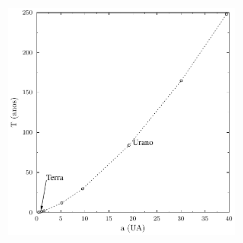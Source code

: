 \documentclass[a4paper]{article}
\begin{document}
\begin{respostas}
\begin{exercicio}
  
  \begin{compactenum}[(a)]
  \item {}\hfill
    \begin{center}
    \includegraphics[width=0.45\textwidth]{Txa_planetas_Sistema_Solar}
    \end{center}
    
  \item {}\hfill
  

\end{compactenum}
\end{exercicio}
\end{respostas}
\end{document}
